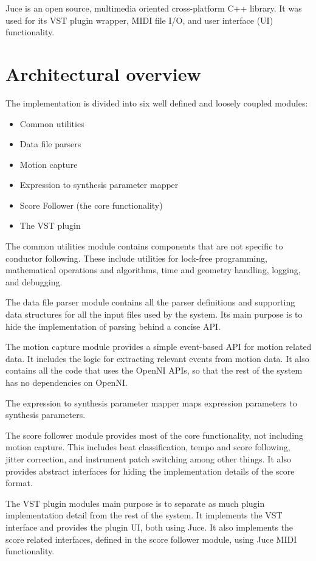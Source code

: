 Juce \cite{juce} is an open source,
multimedia oriented cross-platform C++ library.
It was used for its
VST plugin wrapper, MIDI file I/O,
and user interface (UI) functionality.

\section{Architectural overview}

The implementation is divided into
six well defined and loosely coupled modules:
\begin{itemize}
\item Common utilities
\item Data file parsers
\item Motion capture
\item Expression to synthesis parameter mapper
\item Score Follower (the core functionality)
\item The VST plugin
\end{itemize}

The common utilities module contains components
that are not specific to conductor following.
These include utilities for
lock-free programming,
mathematical operations and algorithms,
time and geometry handling,
logging, and debugging.

The data file parser module
contains all the parser definitions
and supporting data structures
for all the input files used by the system.
Its main purpose is to hide the implementation
of parsing behind a concise API.

The motion capture module provides a simple
event-based API for motion related data.
It includes the logic for extracting relevant events from motion data.
It also contains all the code that uses the OpenNI APIs,
so that the rest of the system has no dependencies on OpenNI.

The expression to synthesis parameter mapper
maps expression parameters to synthesis parameters.

The score follower module provides most of the core functionality,
not including motion capture.
This includes
beat classification, tempo and score following, jitter correction,
and instrument patch switching among other things.
It also provides abstract interfaces for 
hiding the implementation details of the score format.

The VST plugin modules main purpose is to
separate as much plugin implementation detail from the rest of the system.
It implements the VST interface and provides the plugin UI,
both using Juce.
It also implements the score related interfaces,
defined in the score follower module,
using Juce MIDI functionality.

